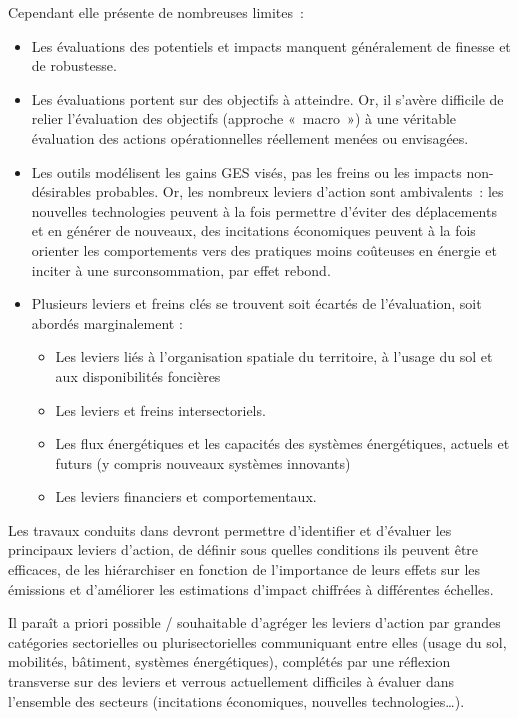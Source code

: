 Cependant elle présente de nombreuses limites :
\begin{itemize}
    \item Les évaluations des potentiels et impacts manquent généralement de finesse et de robustesse.
    \item Les évaluations portent sur des objectifs à atteindre. Or, il s’avère difficile de relier l’évaluation des objectifs (approche « macro ») à une véritable évaluation des actions opérationnelles réellement menées ou envisagées. 
    \item Les outils modélisent les gains GES visés, pas les freins ou les impacts non-désirables probables. Or, les nombreux leviers d’action sont ambivalents : les nouvelles technologies peuvent à la fois permettre d’éviter des déplacements et en générer de nouveaux, des incitations économiques peuvent à la fois orienter les comportements vers des pratiques moins coûteuses en énergie et inciter à une surconsommation, par effet rebond.
    \item Plusieurs leviers et freins clés se trouvent soit écartés de l’évaluation, soit abordés marginalement : 
    \begin{itemize}
        \item Les leviers liés à l’organisation spatiale du territoire, à l’usage du sol et aux disponibilités foncières
        \item Les leviers et freins intersectoriels.
        \item Les flux énergétiques et les capacités des systèmes énergétiques, actuels et futurs (y compris nouveaux systèmes innovants)
    \item Les leviers financiers et comportementaux.
    \end{itemize}
\end{itemize}

Les travaux conduits dans \myacronym   devront permettre d’identifier et d’évaluer les principaux leviers d’action, de définir sous quelles conditions ils peuvent être efficaces, de les hiérarchiser en fonction de l’importance de leurs effets sur les émissions et d’améliorer les estimations d’impact chiffrées à différentes échelles. 

Il paraît a priori possible / souhaitable d’agréger les leviers d’action par grandes catégories sectorielles ou plurisectorielles communiquant entre elles (usage du sol, mobilités, bâtiment, systèmes énergétiques), complétés par une réflexion transverse sur des leviers et verrous actuellement difficiles à évaluer dans l’ensemble des secteurs (incitations économiques, nouvelles technologies…).


